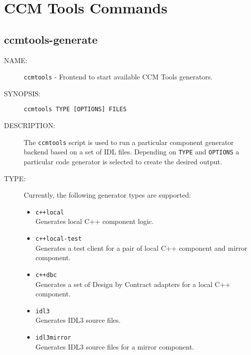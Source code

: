 
\chapter{CCM Tools Commands}

\section{ccmtools-generate}

\begin{description}

\item [NAME:] 
  {\tt ccmtools} - Frontend to start available CCM Tools generators.

\item [SYNOPSIS:] 
  {\tt ccmtools TYPE [OPTIONS] FILES}

\item [DESCRIPTION:]
The {\tt ccmtools} script is used to run a particular component 
generator backend based on a set of IDL files. 
Depending on {\tt TYPE} and {\tt OPTIONS} a particular code generator is 
selected to create the desired output.

\item [TYPE:]
  Currently, the following generator types are supported:
  \begin{itemize}
  \item {\tt c++local}\\
    Generates local C++ component logic.
    
  \item {\tt c++local-test} \\
    Generates a test client for a pair of local C++ component and
    mirror component.
    
  \item {\tt c++dbc} \\
    Generates a set of Design by Contract adapters for a local
    C++ component.
    
  \item {\tt idl3 }\\
    Generates IDL3 source files.

  \item {\tt idl3mirror }\\
    Generates IDL3 source files for a mirror component.
    

\end{itemize}
\end{description}

